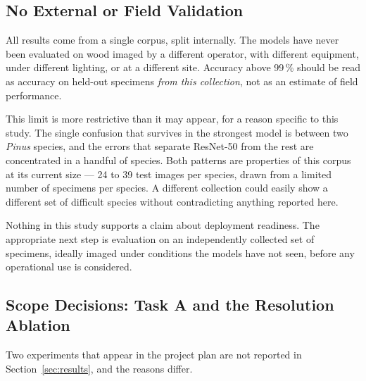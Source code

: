 \subsection{No External or Field Validation}
\label{sec:discussion:external}

All results come from a single corpus, split internally. The models have
never been evaluated on wood imaged by a different operator, with different
equipment, under different lighting, or at a different site. Accuracy above
99\,\% should be read as accuracy on held-out specimens \emph{from this
collection}, not as an estimate of field performance.

This limit is more restrictive than it may appear, for a reason specific to
this study. The single confusion that survives in the strongest model is
between two \textit{Pinus} species, and the errors that separate ResNet-50
from the rest are concentrated in a handful of species. Both patterns are
properties of this corpus at its current size --- 24 to 39 test images per
species, drawn from a limited number of specimens per species. A different
collection could easily show a different set of difficult species without
contradicting anything reported here.

Nothing in this study supports a claim about deployment readiness. The
appropriate next step is evaluation on an independently collected set of
specimens, ideally imaged under conditions the models have not seen, before
any operational use is considered.

\subsection{Scope Decisions: Task A and the Resolution Ablation}
\label{sec:discussion:scope}

Two experiments that appear in the project plan are not reported in
Section~\ref{sec:results}, and the reasons differ.

